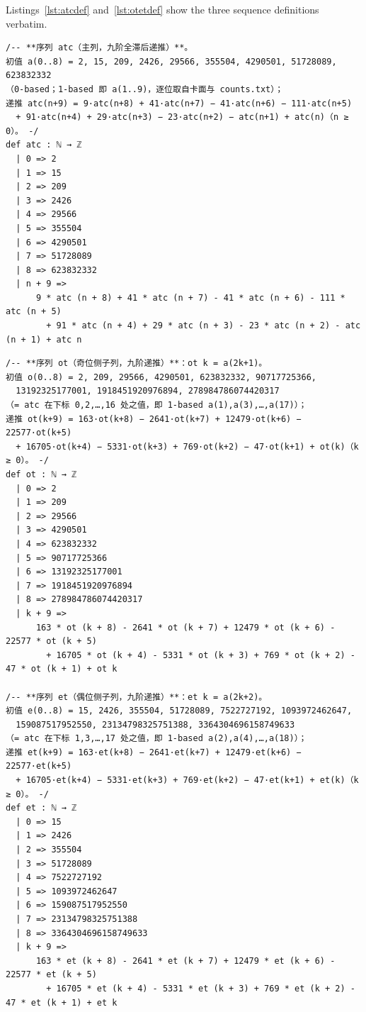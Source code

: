 \documentclass[11pt]{article}
\theoremstyle{definition}
\begin{document}
Listings~\ref{lst:atcdef} and~\ref{lst:otetdef} show the three sequence
definitions verbatim.

\begin{lstlisting}[caption={The main sequence \lean{atc}: nine initial values and
the order-9 recurrence of \eqref{eq:recmain}, verbatim from the frozen statement
file \texttt{formalized/01-comb09-4ntwocorner-statements.lean} (lines 30--47,
sha256 \texttt{4cb10838}). The docstring carries the $0$-based convention
$\texttt{atc}(n) = a(n+1)$.},label={lst:atcdef}]
/-- **序列 atc（主列，九阶全滞后递推）**。
初值 a(0..8) = 2, 15, 209, 2426, 29566, 355504, 4290501, 51728089, 623832332
（0-based；1-based 即 a(1..9)，逐位取自卡面与 counts.txt）；
递推 atc(n+9) = 9·atc(n+8) + 41·atc(n+7) − 41·atc(n+6) − 111·atc(n+5)
  + 91·atc(n+4) + 29·atc(n+3) − 23·atc(n+2) − atc(n+1) + atc(n)（n ≥ 0）。 -/
def atc : ℕ → ℤ
  | 0 => 2
  | 1 => 15
  | 2 => 209
  | 3 => 2426
  | 4 => 29566
  | 5 => 355504
  | 6 => 4290501
  | 7 => 51728089
  | 8 => 623832332
  | n + 9 =>
      9 * atc (n + 8) + 41 * atc (n + 7) - 41 * atc (n + 6) - 111 * atc (n + 5)
        + 91 * atc (n + 4) + 29 * atc (n + 3) - 23 * atc (n + 2) - atc (n + 1) + atc n
\end{lstlisting}

\begin{lstlisting}[caption={The two position subsequences \lean{ot} (odd side) and
\lean{et} (even side), verbatim from the frozen statement file (lines 49--87,
sha256 \texttt{4cb10838}). Both satisfy the same order-9 recurrence
\eqref{eq:recsub}; their initial values are the odd- and even-positioned terms
of \lean{atc}.},label={lst:otetdef}]
/-- **序列 ot（奇位侧子列，九阶递推）**：ot k = a(2k+1)。
初值 o(0..8) = 2, 209, 29566, 4290501, 623832332, 90717725366,
  13192325177001, 1918451920976894, 278984786074420317
（= atc 在下标 0,2,…,16 处之值，即 1-based a(1),a(3),…,a(17)）；
递推 ot(k+9) = 163·ot(k+8) − 2641·ot(k+7) + 12479·ot(k+6) − 22577·ot(k+5)
  + 16705·ot(k+4) − 5331·ot(k+3) + 769·ot(k+2) − 47·ot(k+1) + ot(k)（k ≥ 0）。 -/
def ot : ℕ → ℤ
  | 0 => 2
  | 1 => 209
  | 2 => 29566
  | 3 => 4290501
  | 4 => 623832332
  | 5 => 90717725366
  | 6 => 13192325177001
  | 7 => 1918451920976894
  | 8 => 278984786074420317
  | k + 9 =>
      163 * ot (k + 8) - 2641 * ot (k + 7) + 12479 * ot (k + 6) - 22577 * ot (k + 5)
        + 16705 * ot (k + 4) - 5331 * ot (k + 3) + 769 * ot (k + 2) - 47 * ot (k + 1) + ot k

/-- **序列 et（偶位侧子列，九阶递推）**：et k = a(2k+2)。
初值 e(0..8) = 15, 2426, 355504, 51728089, 7522727192, 1093972462647,
  159087517952550, 23134798325751388, 3364304696158749633
（= atc 在下标 1,3,…,17 处之值，即 1-based a(2),a(4),…,a(18)）；
递推 et(k+9) = 163·et(k+8) − 2641·et(k+7) + 12479·et(k+6) − 22577·et(k+5)
  + 16705·et(k+4) − 5331·et(k+3) + 769·et(k+2) − 47·et(k+1) + et(k)（k ≥ 0）。 -/
def et : ℕ → ℤ
  | 0 => 15
  | 1 => 2426
  | 2 => 355504
  | 3 => 51728089
  | 4 => 7522727192
  | 5 => 1093972462647
  | 6 => 159087517952550
  | 7 => 23134798325751388
  | 8 => 3364304696158749633
  | k + 9 =>
      163 * et (k + 8) - 2641 * et (k + 7) + 12479 * et (k + 6) - 22577 * et (k + 5)
        + 16705 * et (k + 4) - 5331 * et (k + 3) + 769 * et (k + 2) - 47 * et (k + 1) + et k
\end{lstlisting}
\end{document}
